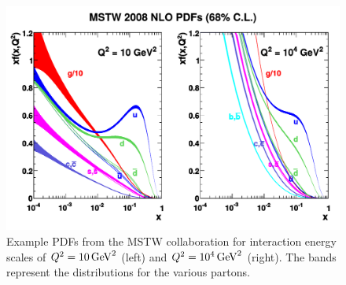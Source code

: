 \begin{figure}[!htbs]
    \centering
    \includegraphics[width=\textwidth]{figures/mstw_pdfs.pdf}
    \caption[
        Example PDFs from the MSTW collaboration.
    ]{
        Example PDFs from the MSTW collaboration for interaction energy scales
        of $\InteractionEnergy = \SI{10}{\GeV\squared}$ (left) and
        $\InteractionEnergy = \SI{e4}{\GeV\squared}$ (right). The bands
        represent the  distributions for the various partons.
    }
    \label{fig:mstw_pdf}
\end{figure}
